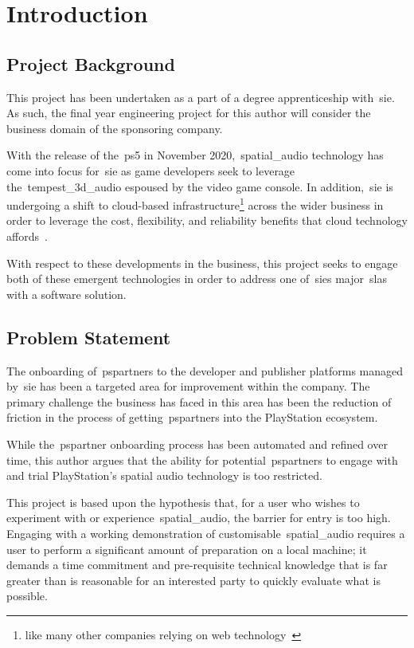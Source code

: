 \thispagestyle{plain}
\newpage
\section{Introduction}\label{sec:introduction}
\subsection{Project Background}\label{subsec:project-background}
\normalsize

This project has been undertaken as a part of a degree apprenticeship with~\gls{sie}.
As such, the final year engineering project for this author will consider the business domain of the sponsoring company.

With the release of the~\gls{ps5} in November 2020,~\gls{spatial_audio} technology has come into focus for~\gls{sie} as game developers seek to leverage the~\gls{tempest_3d_audio} espoused by the video game console.
In addition,~\gls{sie} is undergoing a shift to cloud-based infrastructure\footnote{like many other companies relying on web technology~\citep{cc_overview}} across the wider business in order to leverage the cost, flexibility, and reliability benefits that cloud technology affords~\citep{cc_overview}.

With respect to these developments in the business, this project seeks to engage both of these emergent technologies in order to address one of~\gls{sie}\textquotesingle s major~\glspl{sla} with a software solution.

\subsection{Problem Statement}\label{subsec:problem-statement}

The onboarding of~\glspl{pspartner} to the developer and publisher platforms managed by~\gls{sie} has been a targeted area for improvement within the company.
The primary challenge the business has faced in this area has been the reduction of friction in the process of getting~\glspl{pspartner} into the PlayStation ecosystem.

While the~\gls{pspartner} onboarding process has been automated and refined over time, this author argues that the ability for potential~\glspl{pspartner} to engage with and trial PlayStation's spatial audio technology is too restricted.

This project is based upon the hypothesis that, for a user who wishes to experiment with or experience~\gls{spatial_audio}, the barrier for entry is too high.
Engaging with a working demonstration of customisable~\gls{spatial_audio} requires a user to perform a significant amount of preparation on a local machine;
it demands a time commitment and pre-requisite technical knowledge that is far greater than is reasonable for an interested party to quickly evaluate what is possible.

